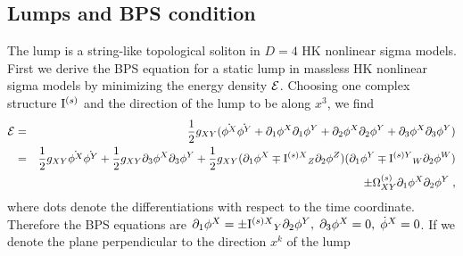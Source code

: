\documentclass[a4paper,12pt]{article}
\begin{document}
\subsection{Lumps and BPS %
condition}
The lump is a string-like topological soliton  
in $D=4$ HK nonlinear sigma models. 
First we derive the BPS equation for a static lump in 
massless HK nonlinear sigma models by minimizing 
the energy density ${\cal E}$. 
Choosing one complex structure ${\rm I}^{(s)}$ and the direction of 
the lump to be along $x^3$, we find  
\begin{eqnarray}
  {\cal E} &=& \frac{1}{2}g_{XY}(\dot{\phi^X}\dot{\phi^Y}
                + \partial_1\phi^X\partial_1\phi^Y 
                + \partial_2\phi^X\partial_2\phi^Y 
                + \partial_3\phi^X\partial_3\phi^Y) 
                \nonumber \\
           &=& \frac{1}{2}g_{XY}\dot{\phi^X}\dot{\phi^Y}
              +\frac{1}{2}g_{XY}\partial_3{\phi^X}\partial_3{\phi^Y}
                +\frac{1}{2}g_{XY}
                (\partial_1\phi^X \mp {{\rm I}^{(s)X}}_Z
                \partial_2\phi^Z)
                 (\partial_1\phi^Y \mp {{\rm I}^{(s)Y}}_W
                \partial_2\phi^W) \nonumber \\
           &{}& \pm {\Omega}^{(s)}_{XY}
                \partial_1\phi^X \partial_2\phi^Y\;,
\label{energydens}
\end{eqnarray}
where dots denote the differentiations with respect to 
the time coordinate. 
Therefore the BPS equations are 
$\partial_1\phi^X = \pm {{\rm I}^{(s)X}}_Y\partial_2\phi^Y, 
\; \partial_3\phi^X=0, \; \dot{\phi}^X = 0$.
If we denote the plane perpendicular to the direction $x^k$ of the lump 
\end{document}
